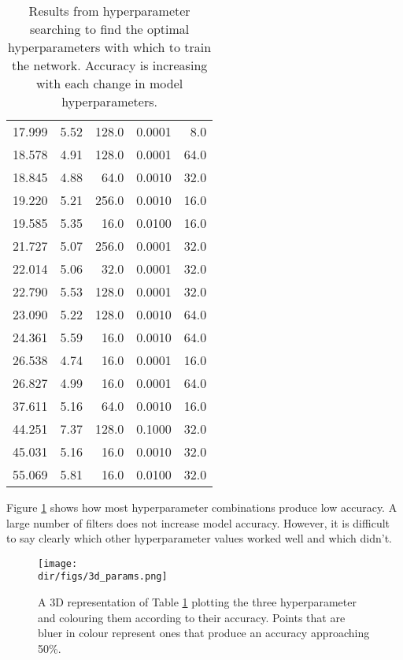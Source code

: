 \begin{table}[htpb]
\begin{adjustbox}{totalheight=\baselineskip}
\begin{tabular}{rrrrr}
   17.999 &   5.52 &       128.0 &         0.0001 &          8.0 \\
   18.578 &   4.91 &       128.0 &         0.0001 &         64.0 \\
   18.845 &   4.88 &        64.0 &         0.0010 &         32.0 \\
   19.220 &   5.21 &       256.0 &         0.0010 &         16.0 \\
   19.585 &   5.35 &        16.0 &         0.0100 &         16.0 \\
   21.727 &   5.07 &       256.0 &         0.0001 &         32.0 \\
   22.014 &   5.06 &        32.0 &         0.0001 &         32.0 \\
   22.790 &   5.53 &       128.0 &         0.0001 &         32.0 \\
   23.090 &   5.22 &       128.0 &         0.0010 &         64.0 \\
   24.361 &   5.59 &        16.0 &         0.0010 &         64.0 \\
   26.538 &   4.74 &        16.0 &         0.0001 &         16.0 \\
   26.827 &   4.99 &        16.0 &         0.0001 &         64.0 \\
   37.611 &   5.16 &        64.0 &         0.0010 &         16.0 \\
   44.251 &   7.37 &       128.0 &         0.1000 &         32.0 \\
   45.031 &   5.16 &        16.0 &         0.0010 &         32.0 \\
   55.069 &   5.81 &        16.0 &         0.0100 &         32.0 \\
\bottomrule
\end{tabular}
\end{adjustbox}
\caption[Hyperparameter Search Results]{Results from hyperparameter searching to find the optimal hyperparameters with which to train the network. Accuracy is increasing with each change in model hyperparameters.}
\label{tab.hyper_param}
\end{table}
Figure \ref{fig.3d_hyperparams} shows how most hyperparameter combinations produce low accuracy. A large number of filters does not increase model accuracy. However, it is difficult to say clearly which other hyperparameter values worked well and which didn't.  
\begin{figure}[htpb]
    \centering
    \texttt{[image: \\dir/figs/3d\_params.png]}
    \caption[3D representation of the accuracy of different hyperparameter combinations]{A 3D representation of Table \ref{tab.hyper_param} plotting the three hyperparameter and colouring them according to their accuracy. Points that are bluer in colour represent ones that produce an accuracy approaching 50\%.  }
    \label{fig.3d_hyperparams}
\end{figure}
